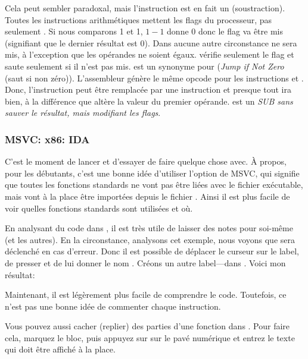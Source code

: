 \label{CMPandSUB} 
Cela peut sembler paradoxal, mais l'instruction \CMP est en fait un \SUB (soustraction).
Toutes les instructions arithmétiques mettent les flags du processeur, pas seulement \CMP.
Si nous comparons 1 et 1, $1-1$ donne 0 donc le flag \ZF va être mis (signifiant
que le dernier résultat est 0).
Dans aucune autre circonstance \ZF ne sera mis, à l'exception que les opérandes
ne soient égaux.
\JNE vérifie seulement le flag \ZF et saute seulement si il n'est pas mis. \JNE
est un synonyme pour \JNZ (\emph{Jump if Not Zero} (saut si non zéro)).
L'assembleur génère le même opcode pour les instructions \JNE et \JNZ.
Donc, l'instruction \CMP peut être remplacée par une instruction \SUB et presque
tout ira bien, à la différence que \SUB altère la valeur du premier opérande.
\CMP est un \emph{SUB sans sauver le résultat, mais modifiant les flags}.

\subsubsection{MSVC: x86: IDA}

C'est le moment de lancer \IDA et d'essayer de faire quelque chose avec.
À propos, pour les débutants, c'est une bonne idée d'utiliser l'option 
de MSVC, qui signifie que toutes les fonctions standards ne vont pas être liées
avec le fichier exécutable, mais vont à la place être importées depuis le fichier
.
Ainsi il est plus facile de voir quelles fonctions standards sont utilisées et où.

En analysant du code dans \IDA, il est très utile de laisser des notes pour soi-même
(et les autres).
En la circonstance, analysons cet exemple, nous voyons que  sera déclenché
en cas d'erreur.
Donc il est possible de déplacer le curseur sur le label, de presser  et de
lui donner le nom .
Créons un autre label---dans .
Voici mon résultat:



Maintenant, il est légèrement plus facile de comprendre le code.
Toutefois, ce n'est pas une bonne idée de commenter chaque instruction.

Vous pouvez aussi cacher (replier) des parties d'une fonction dans \IDA.
Pour faire cela, marquez le bloc, puis appuyez sur \q{--} sur le pavé numérique et
entrez le texte qui doit être affiché à la place.

